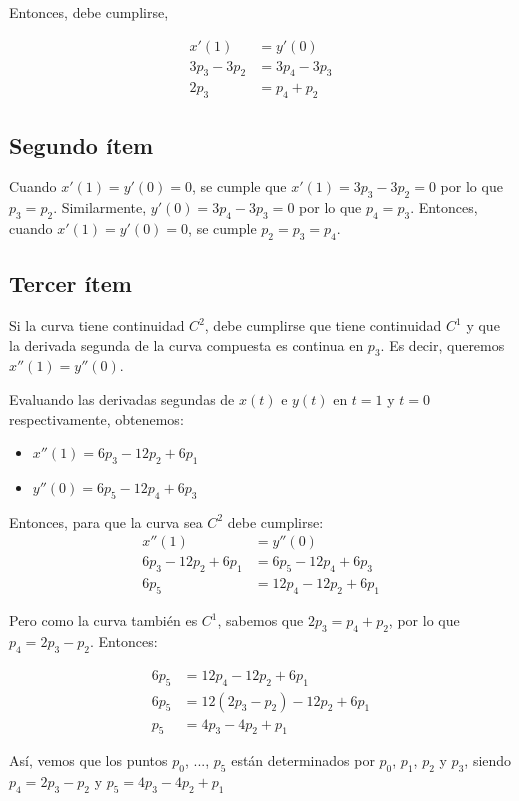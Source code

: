 \documentclass{article}
\begin{document}
Entonces, debe cumplirse,

$$
\begin{aligned}
x'(1) &= y'(0) \\
3p_3 - 3p_2 &= 3p_4 - 3p_3 \\
2p_3 &= p_4 +p_2
\end{aligned}
$$

\subsection*{Segundo ítem}
Cuando $x'(1) = y'(0) = 0$, se cumple que $x'(1) = 3p_3 - 3p_2 = 0$ por lo que $p_3 = p_2$. Similarmente, $y'(0) = 3p_4 - 3p_3 = 0$ por lo que $p_4 = p_3$. Entonces, cuando $x'(1) = y'(0) = 0$, se cumple $p_2 = p_3 = p_4$.

\subsection*{Tercer ítem}
Si la curva tiene continuidad $C^2$, debe cumplirse que tiene continuidad $C^1$ y que la derivada segunda de la curva compuesta es continua en $p_3$. Es decir, queremos $x''(1) = y''(0)$.

Evaluando las derivadas segundas de $x(t)$ e $y(t)$ en $t = 1$ y $t=0$ respectivamente, obtenemos:
\begin{itemize}
    \item $x''(1) = 6p_3 -12p_2 + 6p_1$
    \item $y''(0) = 6p_5 -12p_4 + 6p_3$
\end{itemize}

Entonces, para que la curva sea $C^2$ debe cumplirse:
$$
\begin{aligned}
x''(1) &= y''(0) \\
6p_3 -12p_2 + 6p_1 &= 6p_5 -12p_4 + 6p_3 \\
6p_5 &= 12p_4-12p_2+6p_1
\end{aligned}
$$

Pero como la curva también es $C^1$, sabemos que $2p_3 = p_4 +p_2$, por lo que $p_4 = 2p_3-p_2$. Entonces:

$$
\begin{aligned}
6p_5 &= 12p_4-12p_2+6p_1 \\
6p_5 &= 12(2p_3-p_2)-12p_2+6p_1 \\
p_5 &= 4p_3 - 4p_2 +p_1
\end{aligned}
$$

Así, vemos que los puntos $p_0$, ..., $p_5$ están determinados por $p_0$, $p_1$, $p_2$ y $p_3$, siendo  $p_4 = 2p_3-p_2$ y $p_5 = 4p_3 - 4p_2 +p_1$
\end{document}
